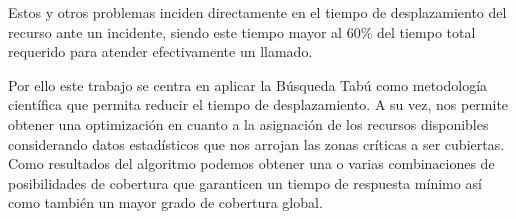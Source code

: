 Estos y otros problemas inciden directamente en el tiempo de desplazamiento del recurso ante un incidente, siendo este tiempo mayor al 60\% del tiempo total requerido para atender efectivamente un llamado.

Por ello este trabajo se centra en aplicar la Búsqueda Tabú como metodología científica que permita reducir el tiempo de desplazamiento. A su vez, nos permite obtener una optimización en cuanto a la asignación de los recursos disponibles considerando datos estadísticos que nos arrojan las zonas críticas a ser cubiertas. Como resultados del algoritmo podemos obtener una o varias combinaciones de posibilidades de cobertura que garanticen un tiempo de respuesta mínimo así como también un mayor grado de cobertura global.
